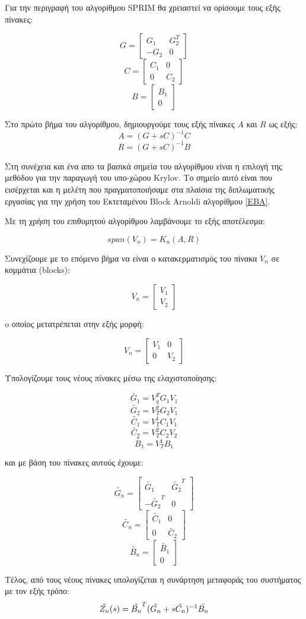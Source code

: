 Για την περιγραφή του αλγορίθμου \textlatin{SPRIM} θα χρειαστεί να ορίσουμε τους εξής πίνακες:

\[
   G = 
    \begin{bmatrix}
    G_1  & G^T_2\\
    -G_2 & 0
    \end{bmatrix}
\]
\[
    C = 
    \begin{bmatrix}
    C_1  & 0\\
    0 & C_2
    \end{bmatrix}
\]
\[
    B = 
    \begin{bmatrix}
    B_1\\
    0
    \end{bmatrix}
\]

Στο πρώτο βήμα του αλγορίθμου, δημιουργούμε τους εξής πίνακες $A$ και $R$ ως εξής:
\[
    A = (G + sC)^{-1}C
\]
\[
    R = (G + sC)^{-1}B
\]

Στη συνέχεια και ένα απο τα βασικά σημεία του αλγορίθμου είναι η επιλογή της μεθόδου για την παραγωγή του υπο-χώρου \textlatin{Krylov}. Το σημείο αυτό είναι που εισέρχεται και η μελέτη που πραγματοποιήσαμε στα πλαίσια της διπλωματικής εργασίας για την χρήση του Εκτεταμένου \textlatin{Block Arnoldi} αλγορίθμου \ref{EBA}.

Με τη χρήση του επιθυμητού αλγορίθμου λαμβάνουμε το εξής αποτέλεσμα:

\[
    span(V_n) = K_n(A, R)
\]

Συνεχίζουμε με το επόμενο βήμα να είναι ο κατακερματισμός του πίνακα $V_n$ σε κομμάτια (\textlatin{blocks}):

\[
V_n = \begin{bmatrix}
V_1 \\
V_2
\end{bmatrix}
\]

o οποίος μετατρέπεται στην εξής μορφή:

\[
V_n = \begin{bmatrix}
V_1 & 0 \\
0 & V_2
\end{bmatrix}
\]

Υπολογίζουμε τους νέους πίνακες μέσω της ελαχιστοποίησης:

\[
    \widetilde{G_1} = V_q^{T}G_1V_1
\]
\[
    \widetilde{G_2} = V^2_TG_2V_1
\]
\[
    \widetilde{C_1} = V^1_TC_1V_1
\]
\[
    \widetilde{C_2} = V^2_TC_2V_2
\]
\[
    \widetilde{B_1} = V^1_TB_1
\]

και με βάση του πίνακες αυτούς έχουμε:


\[
\widetilde{G_n} = \begin{bmatrix}
\widetilde{G_1} & \widetilde{G_2}^T \\
-\widetilde{G_2}^T & 0
\end{bmatrix}
\]
\[
\widetilde{C_n} = \begin{bmatrix}
\widetilde{C_1} & 0 \\
0 & \widetilde{C_2}
\end{bmatrix}
\]
\[
\widetilde{B_n} = \begin{bmatrix}
\widetilde{B_1} \\
0
\end{bmatrix}
\]

Τέλος, από τους νέους πίνακες υπολογίζεται η συνάρτηση μεταφοράς του συστήματος με
τον εξής τρόπο:
\begin{equation}
    \Tilde{Z_n}(s) = \Tilde{B_n}^T(\Tilde{G_n} + s\Tilde{C_n})^{-1}\Tilde{B_n}
\end{equation}